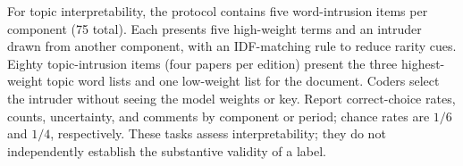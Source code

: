 For topic interpretability, the protocol contains five word-intrusion items per component (75 total). Each presents five high-weight terms and an intruder drawn from another component, with an IDF-matching rule to reduce rarity cues. Eighty topic-intrusion items (four papers per edition) present the three highest-weight topic word lists and one low-weight list for the document. Coders select the intruder without seeing the model weights or key. Report correct-choice rates, counts, uncertainty, and comments by component or period; chance rates are $1/6$ and $1/4$, respectively. These tasks assess interpretability; they do not independently establish the substantive validity of a label.
